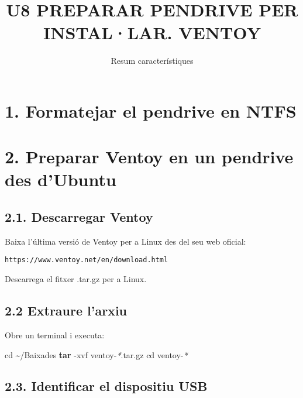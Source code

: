 \documentclass[
  12 pt,
  a4paper,
]{article}
\title{U8 PREPARAR PENDRIVE PER INSTAL·LAR. VENTOY}
\subtitle{Resum característiques}
\author{}
\date{\vspace{-2.5em}}
\newenvironment{Shaded}{\begin{snugshade}}{\end{snugshade}}
\newcommand{\AttributeTok}[1]{\textcolor[rgb]{0.13,0.29,0.53}{#1}}
\newcommand{\BuiltInTok}[1]{#1}
\newcommand{\FunctionTok}[1]{\textcolor[rgb]{0.13,0.29,0.53}{\textbf{#1}}}
\newcommand{\NormalTok}[1]{#1}
\newcommand{\PreprocessorTok}[1]{\textcolor[rgb]{0.56,0.35,0.01}{\textit{#1}}}
\begin{document}
\maketitle

\newpage
\renewcommand\tablename{Tabla}

\section{1. Formatejar el pendrive en
NTFS}\label{formatejar-el-pendrive-en-ntfs}

\section{2. Preparar Ventoy en un pendrive des
d'Ubuntu}\label{preparar-ventoy-en-un-pendrive-des-dubuntu}

\subsection{2.1. Descarregar Ventoy}\label{descarregar-ventoy}

Baixa l'última versió de Ventoy per a Linux des del seu web oficial:

\begin{verbatim}
https://www.ventoy.net/en/download.html
\end{verbatim}

Descarrega el fitxer .tar.gz per a Linux.

\subsection{2.2 Extraure l'arxiu}\label{extraure-larxiu}

Obre un terminal i executa:

\begin{Shaded}
\begin{Highlighting}[]
\BuiltInTok{cd}\NormalTok{ \textasciitilde{}/Baixades}
\FunctionTok{tar} \AttributeTok{{-}xvf}\NormalTok{ ventoy{-}}\PreprocessorTok{*}\NormalTok{.tar.gz}
\BuiltInTok{cd}\NormalTok{ ventoy{-}}\PreprocessorTok{*}
\end{Highlighting}
\end{Shaded}

\subsection{2.3. Identificar el dispositiu
USB}\label{identificar-el-dispositiu-usb}
\end{document}
